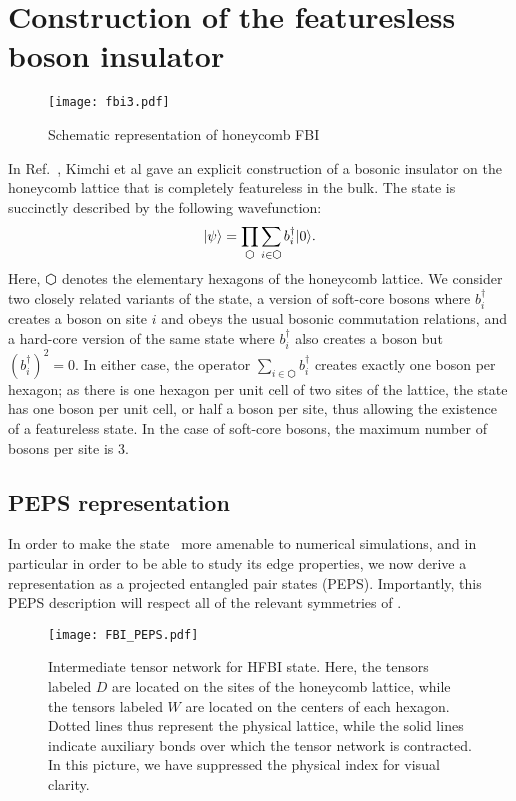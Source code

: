 
\section{Construction of the featuresless boson insulator}
\label{sec:fbi}

\begin{figure}
	\centering
	\texttt{[image: fbi3.pdf]}
	\caption{Schematic representation of honeycomb FBI}
\end{figure}

In Ref.~, Kimchi et al gave an explicit
construction of a bosonic insulator
on the honeycomb lattice that is completely featureless in the bulk.
The state is succinctly described by the following wavefunction:
\begin{equation} \label{eq:def}
\ket{\psi} = \prod\limits_{\varhexagon} \sum\limits_{i \in
\varhexagon} b^{\dagger}_{i} \ket{0}.
\end{equation}
Here, $\varhexagon$ denotes the elementary hexagons of the honeycomb
lattice. We consider two closely related variants of the state, a
version of soft-core bosons where $b_i^\dagger$ creates a boson on
site $i$ and obeys the usual bosonic commutation relations, and a
hard-core version of the same state where $b_i^\dagger$ also creates a
boson but $(b_i^\dagger)^2=0$. In either case, the operator $\sum_{i
\in \varhexagon} b^{\dagger}_{i}$ creates exactly one boson per
hexagon; as there is one hexagon per unit cell of two sites of the
lattice, the state has one boson per unit cell, or half a boson per
site, thus allowing the existence of a featureless state.
In the case of soft-core bosons, the maximum number of bosons
per site is 3.


\subsection{PEPS representation}

In order to make the state~ more amenable to numerical
simulations, and in particular in order to be able to study its edge
properties, we now derive a representation as a projected entangled
pair states (PEPS). Importantly, this PEPS description will respect
all of the relevant symmetries of .

\begin{figure}
	\centering
	\texttt{[image: FBI\_PEPS.pdf]}
	\caption{
	Intermediate tensor network for HFBI state. Here, the tensors labeled
	$D$ are located on the sites of the honeycomb lattice, while the
	tensors labeled $W$ are located on the centers of each hexagon.
	Dotted lines thus represent the physical lattice, while the solid
	lines indicate auxiliary bonds over which the tensor network is
	contracted. In this picture, we have suppressed the physical index
	for visual clarity.}
	\label{fig:FBI_PEPS}
\end{figure}

